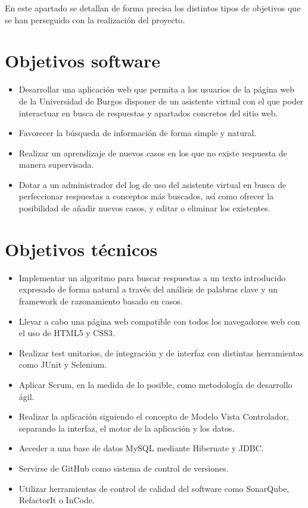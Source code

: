 
En este apartado se detallan de forma precisa los distintos tipos de objetivos que se han perseguido con la realización del proyecto.

\section{Objetivos software}\label{objetivos-software}

\begin{itemize}
\tightlist
\item
  Desarrollar una aplicación web que permita a los usuarios de la página web de la Universidad de Burgos disponer de un asistente virtual con el que poder interactuar en busca de respuestas y apartados concretos del sitio web.
\item
  Favorecer la búsqueda de información de forma simple y natural.
\item
  Realizar un aprendizaje de nuevos casos en los que no existe respuesta de manera supervisada.
\item
   Dotar a un administrador del log de uso del asistente virtual en busca de perfeccionar respuestas a conceptos más buscados, así como ofrecer la posibilidad de añadir nuevos casos, y editar o eliminar los existentes.
\end{itemize}

\section{Objetivos técnicos}\label{objetivos-tecnicos}

\begin{itemize}
\tightlist
\item
Implementar un algoritmo para buscar respuestas a un texto introducido expresado de forma natural a través del análisis de palabras clave y un framework de razonamiento basado en casos.
\item
Llevar a cabo una página web compatible con todos los navegadores web con el uso de HTML5 y CSS3.
\item
Realizar test unitarios, de integración y de interfaz con distintas herramientas como JUnit y Selenium.
\item
Aplicar Scrum, en la medida de lo posible, como metodología de desarrollo ágil.
\item
Realizar la aplicación siguiendo el concepto de Modelo Vista Controlador, separando la interfaz, el motor de la aplicación y los datos.
\item
Acceder a una base de datos MySQL mediante Hibernate y JDBC.
\item
Servirse de GitHub como sistema de control de versiones.
\item
Utilizar herramientas de control de calidad del software como SonarQube, RefactorIt o InCode.

\end{itemize}

